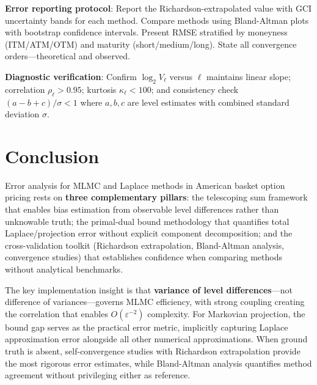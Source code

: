 \documentclass[11pt,a4paper]{article}
\begin{document}
\vspace{0.2cm}

\noindent \textbf{Error reporting protocol}: Report the Richardson-extrapolated value with GCI uncertainty bands for each method. Compare methods using Bland-Altman plots with bootstrap confidence intervals. Present RMSE stratified by moneyness (ITM/ATM/OTM) and maturity (short/medium/long). State all convergence orders---theoretical and observed.

\vspace{0.2cm}

\noindent \textbf{Diagnostic verification}: Confirm $\log_2 V_\ell$ versus $\ell$ maintains linear slope; correlation $\rho_\ell > 0.95$; kurtosis $\kappa_\ell < 100$; and consistency check $(a - b + c)/\sigma < 1$ where $a, b, c$ are level estimates with combined standard deviation $\sigma$.

\section{Conclusion}

Error analysis for MLMC and Laplace methods in American basket option pricing rests on \textbf{three complementary pillars}: the telescoping sum framework that enables bias estimation from observable level differences rather than unknowable truth; the primal-dual bound methodology that quantifies total Laplace/projection error without explicit component decomposition; and the cross-validation toolkit (Richardson extrapolation, Bland-Altman analysis, convergence studies) that establishes confidence when comparing methods without analytical benchmarks.

\vspace{0.2cm}

\noindent The key implementation insight is that \textbf{variance of level differences}---not difference of variances---governs MLMC efficiency, with strong coupling creating the correlation that enables $O(\varepsilon^{-2})$ complexity. For Markovian projection, the bound gap serves as the practical error metric, implicitly capturing Laplace approximation error alongside all other numerical approximations. When ground truth is absent, self-convergence studies with Richardson extrapolation provide the most rigorous error estimates, while Bland-Altman analysis quantifies method agreement without privileging either as reference.
\end{document}
